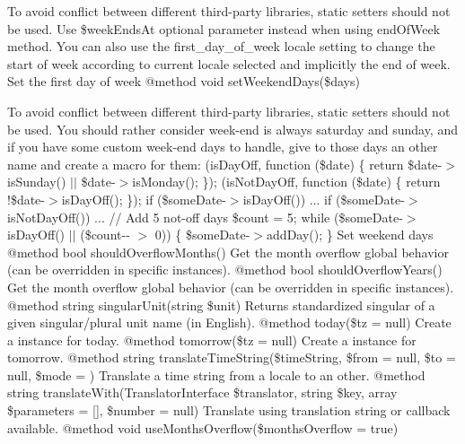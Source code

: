 \begin{DoxyRefList}
To avoid conflict between different third-\/party libraries, static setters should not be used. Use \$week\+Ends\+At optional parameter instead when using end\+Of\+Week method. You can also use the \textquotesingle{}first\+\_\+day\+\_\+of\+\_\+week\textquotesingle{} locale setting to change the start of week according to current locale selected and implicitly the end of week. Set the first day of week @method void set\+Weekend\+Days(\$days) 



To avoid conflict between different third-\/party libraries, static setters should not be used. You should rather consider week-\/end is always saturday and sunday, and if you have some custom week-\/end days to handle, give to those days an other name and create a macro for them\+: {\ttfamily  {}(\textquotesingle{}is\+Day\+Off\textquotesingle{}, function (\$date) \{ return \$date-\/\texorpdfstring{$>$}{>}is\+Sunday() \texorpdfstring{$\vert$}{|}\texorpdfstring{$\vert$}{|} \$date-\/\texorpdfstring{$>$}{>}is\+Monday(); \}); (\textquotesingle{}is\+Not\+Day\+Off\textquotesingle{}, function (\$date) \{ return !\$date-\/\texorpdfstring{$>$}{>}is\+Day\+Off(); \}); if (\$some\+Date-\/\texorpdfstring{$>$}{>}is\+Day\+Off()) ... if (\$some\+Date-\/\texorpdfstring{$>$}{>}is\+Not\+Day\+Off()) ... // Add 5 not-\/off days \$count = 5; while (\$some\+Date-\/\texorpdfstring{$>$}{>}is\+Day\+Off() \texorpdfstring{$\vert$}{|}\texorpdfstring{$\vert$}{|} (\$count-\/-\/ \texorpdfstring{$>$}{>} 0)) \{ \$some\+Date-\/\texorpdfstring{$>$}{>}add\+Day(); \} } Set weekend days @method bool should\+Overflow\+Months() Get the month overflow global behavior (can be overridden in specific instances). @method bool should\+Overflow\+Years() Get the month overflow global behavior (can be overridden in specific instances). @method string singular\+Unit(string \$unit) Returns standardized singular of a given singular/plural unit name (in English). @method  today(\$tz = null) Create a  instance for today. @method  tomorrow(\$tz = null) Create a  instance for tomorrow. @method string translate\+Time\+String(\$time\+String, \$from = null, \$to = null, \$mode = ) Translate a time string from a locale to an other. @method string translate\+With(Translator\+Interface \$translator, string \$key, array \$parameters = \mbox{[}\mbox{]}, \$number = null) Translate using translation string or callback available. @method void use\+Months\+Overflow(\$months\+Overflow = true) 




\end{DoxyRefList}
